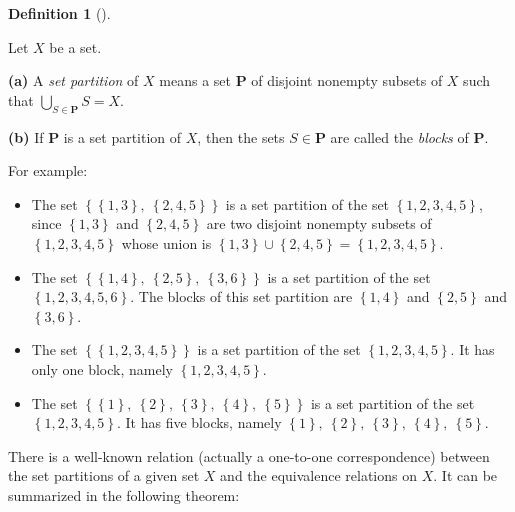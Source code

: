 \documentclass[numbers=enddot,12pt,final,onecolumn,notitlepage]{scrartcl}%
\theoremstyle{definition}
\newtheorem{defi}[theo]{Definition}
\newenvironment{definition}[1][]
{\begin{defi}[#1]\begin{leftbar}}
{\end{leftbar}\end{defi}}
\let\bigcupnonlimits\bigcup
\renewcommand{\bigcup}{\bigcupnonlimits\limits}
\begin{document}
\begin{definition}
Let $X$ be a set.

\textbf{(a)} A \emph{set partition} of $X$ means a set $\mathbf{P}$ of
disjoint nonempty subsets of $X$ such that $\bigcup_{S\in\mathbf{P}}S=X$.

\textbf{(b)} If $\mathbf{P}$ is a set partition of $X$, then the sets
$S\in\mathbf{P}$ are called the \emph{blocks} of $\mathbf{P}$.
\end{definition}

For example:

\begin{itemize}
\item The set $\left\{  \left\{  1,3\right\}  ,\ \left\{  2,4,5\right\}
\right\}  $ is a set partition of the set $\left\{  1,2,3,4,5\right\}  $,
since $\left\{  1,3\right\}  $ and $\left\{  2,4,5\right\}  $ are two disjoint
nonempty subsets of $\left\{  1,2,3,4,5\right\}  $ whose union is $\left\{
1,3\right\}  \cup\left\{  2,4,5\right\}  =\left\{  1,2,3,4,5\right\}  $.

\item The set $\left\{  \left\{  1,4\right\}  ,\ \left\{  2,5\right\}
,\ \left\{  3,6\right\}  \right\}  $ is a set partition of the set $\left\{
1,2,3,4,5,6\right\}  $. The blocks of this set partition are $\left\{
1,4\right\}  $ and $\left\{  2,5\right\}  $ and $\left\{  3,6\right\}  $.

\item The set $\left\{  \left\{  1,2,3,4,5\right\}  \right\}  $ is a set
partition of the set $\left\{  1,2,3,4,5\right\}  $. It has only one block,
namely $\left\{  1,2,3,4,5\right\}  $.

\item The set $\left\{  \left\{  1\right\}  ,\ \left\{  2\right\}  ,\ \left\{
3\right\}  ,\ \left\{  4\right\}  ,\ \left\{  5\right\}  \right\}  $ is a set
partition of the set $\left\{  1,2,3,4,5\right\}  $. It has five blocks,
namely $\left\{  1\right\}  ,\ \left\{  2\right\}  ,\ \left\{  3\right\}
,\ \left\{  4\right\}  ,\ \left\{  5\right\}  $.
\end{itemize}

There is a well-known relation (actually a one-to-one correspondence) between
the set partitions of a given set $X$ and the equivalence relations on $X$. It
can be summarized in the following theorem:
\end{document}
